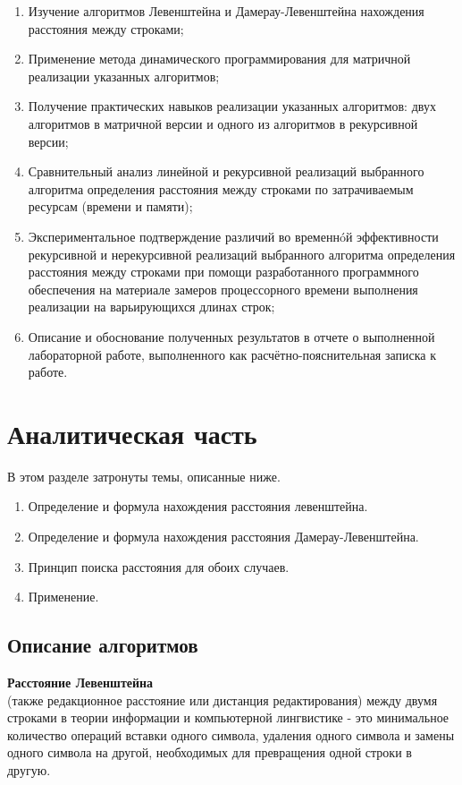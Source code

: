 \documentclass[a4paper, 14pt]{article}
\begin{document}
\begin{enumerate}
\item Изучение алгоритмов Левенштейна и Дамерау-Левенштейна нахождения расстояния между
    строками;
\item Применение метода динамического программирования для матричной реализации указанных
    алгоритмов;
\item Получение практических навыков реализации указанных алгоритмов: двух алгоритмов в
    матричной версии и одного из алгоритмов в рекурсивной версии;
\item Сравнительный анализ линейной и рекурсивной реализаций выбранного алгоритма
    определения расстояния между строками по затрачиваемым ресурсам (времени и памяти);
\item Экспериментальное подтверждение различий во временнóй эффективности рекурсивной и
    нерекурсивной реализаций выбранного алгоритма определения расстояния между строками при
    помощи разработанного программного обеспечения на материале замеров процессорного времени
    выполнения реализации на варьирующихся длинах строк;
\item Описание и обоснование полученных результатов в отчете о выполненной лабораторной
    работе, выполненного как расчётно-пояснительная записка к работе.
\end{enumerate}


	\newpage
	\section{Аналитическая часть}
В этом разделе затронуты темы, описанные ниже.
\begin{enumerate}
\item Определение и формула нахождения расстояния левенштейна.
\item Определение и формула нахождения расстояния Дамерау-Левенштейна.
\item Принцип поиска расстояния для обоих случаев.
\item Применение.
\end{enumerate}
	\subsection{Описание алгоритмов}
	\normalsize \textbf {Расстояние Левенштейна} \\ \normalsize (также редакционное расстояние или дистанция редактирования) между двумя строками в теории информации и компьютерной лингвистике - это минимальное количество операций вставки одного символа, удаления одного символа и замены одного символа на другой, необходимых для превращения одной строки в другую.
    
\end{document}
